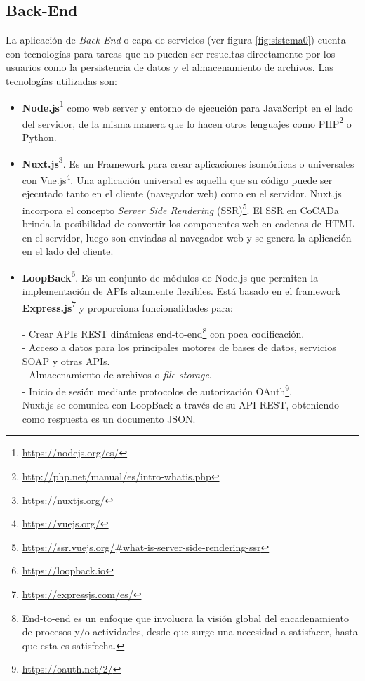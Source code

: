     
\subsection{Back-End}
La aplicación de \textit{Back-End} o capa de servicios (ver figura  \ref {fig:sistema0}) cuenta con tecnologías para tareas que no pueden ser resueltas directamente por los usuarios como la persistencia de datos y el almacenamiento de archivos. Las tecnologías utilizadas son:

\begin{itemize}

    \item \textbf{\Gls{Node.js}}\footnote{\url{https://nodejs.org/es/}} como web server y entorno de ejecución para JavaScript en el lado del servidor, de la misma manera que lo hacen otros lenguajes como \Gls{PHP}\footnote{\url{http://php.net/manual/es/intro-whatis.php}} o Python. 
    
    \item \textbf{\Gls{Nuxt.js}}\footnote{\url{https://nuxtjs.org/}}. Es un \gls{Framework} para crear aplicaciones isomórficas o universales con \Gls{Vue.js}\footnote{\url{https://vuejs.org/}}. Una aplicación  universal  es  aquella  que su código puede ser ejecutado tanto en el cliente (navegador web) como en el servidor. Nuxt.js incorpora el concepto \textit{Server Side Rendering}  (\Gls{SSR})\footnote{\url{https://ssr.vuejs.org/#what-is-server-side-rendering-ssr}}.
    El SSR en CoCADa brinda la posibilidad de convertir los  componentes web en cadenas de HTML en el servidor, luego son enviadas al navegador web y se genera la aplicación en el lado del cliente. 
    
    \item \textbf{\Gls{LoopBack}}\footnote{\url{https://loopback.io}}. Es un conjunto de módulos de Node.js que permiten la implementación de APIs \citep{masse2011rest} altamente flexibles. Está basado en el framework \textbf{\Gls{Express.js}}\footnote{\url{https://expressjs.com/es/}} y proporciona funcionalidades para:
    
    - Crear APIs \Gls{REST} dinámicas end-to-end\footnote{End-to-end es un enfoque que involucra la visión global del encadenamiento de procesos y/o actividades, desde que surge una necesidad a satisfacer, hasta que esta es satisfecha.} con poca codificación.\\
    - Acceso a datos para los principales motores de bases de datos, servicios \Gls{SOAP} y otras APIs. \\
    - Almacenamiento de archivos o \textit{\Gls{file storage}}.\\
    - Inicio de sesión mediante protocolos de autorización \Gls{OAuth}\footnote{\url{https://oauth.net/2/}}.\\
    Nuxt.js se comunica con LoopBack a través de su API REST, obteniendo como respuesta es un documento \Gls{JSON}.
    

\end{itemize}
